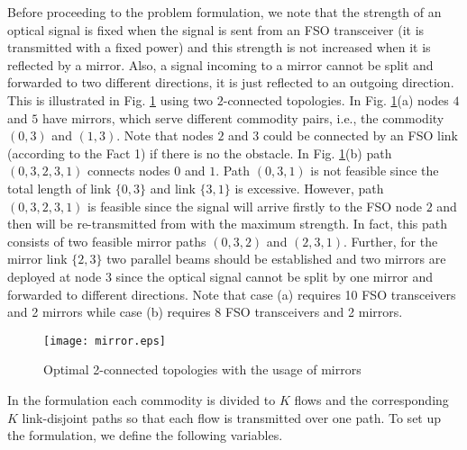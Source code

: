 \documentclass[onecolumn,11pt,draftclsnofoot]{IEEEtran}
\begin{document}
Before proceeding to the problem formulation, we note that the strength of an optical signal is fixed when the signal is sent from an FSO transceiver (it is transmitted with a fixed power) and this strength is not increased when it is reflected by a mirror. Also, a signal incoming to a mirror cannot be split and forwarded to two different directions, it is just reflected to an outgoing direction. This is illustrated in Fig. \ref{fig:mirror} using two $2$-connected topologies. In Fig. \ref{fig:mirror}(a) nodes $4$ and $5$ have mirrors, which serve different commodity pairs, i.e., the commodity  $(0,3)$ and $(1,3)$. Note that nodes $2$ and $3$ could be connected by an FSO link (according to the Fact 1) if there is no the obstacle.
In Fig. \ref{fig:mirror}(b) path $(0,3,2,3,1)$ connects nodes $0$ and $1$. Path $(0,3,1)$ is not feasible since the total length of link $\{0,3\}$ and link $\{3,1\}$ is excessive. However, path $(0,3,2,3,1)$ is feasible since the signal will arrive firstly to the FSO node $2$ and then will be re-transmitted from with the maximum strength. In fact, this path consists of two feasible mirror paths $(0,3,2)$ and $(2,3,1)$. Further, for the mirror link $\{2,3\}$ two parallel beams should be established and two mirrors are deployed at node $3$ since the optical signal cannot be split by one mirror and forwarded to different directions. Note that case (a) requires 10 FSO transceivers and 2 mirrors while case (b) requires 8 FSO transceivers and 2 mirrors.

\begin{figure}[!hbtp]
  \centering
  \texttt{[image: mirror.eps]}\\
  \caption{Optimal 2-connected topologies with the usage of mirrors}\label{fig:mirror}
\end{figure}

In the formulation each commodity is divided to $K$ flows and the corresponding $K$ link-disjoint paths so that each flow is transmitted over one path. To set up the formulation, we define the following variables.
\end{document}
